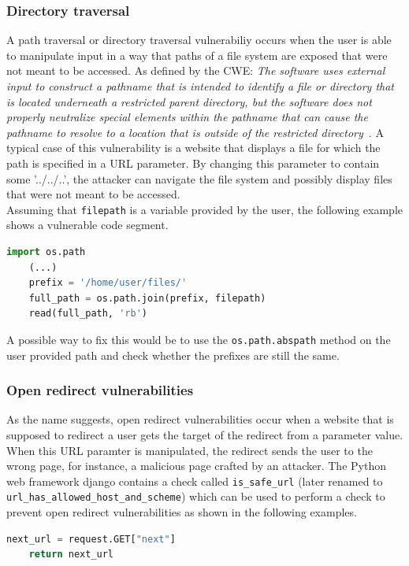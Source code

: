 \documentclass[
a4paper,
pagesize,
pdftex,
12pt,
twoside, %
BCOR=5mm, %
ngerman,
fleqn,
final,
]{scrartcl}
\begin{document}
	\subsubsection{Directory traversal}
	A path traversal or directory traversal vulnerabiliy occurs when the user is able to manipulate input in a way that paths of a file system are exposed that were not meant to be accessed. 
	As defined by the CWE: \textit{The software uses external input to construct a pathname that is intended to identify a file or directory that is located underneath a restricted parent directory, but the software does not properly neutralize special elements within the pathname that can cause the pathname to resolve to a location that is outside of the restricted directory}~\cite{CommonWeaknessEnumeration.19.9.2019c}. A typical case of this vulnerability is a website that displays a file for which the path is specified in a URL parameter. By changing this parameter to contain some '../../..', the attacker can navigate the file system and possibly display files that were not meant to be accessed.\\
	Assuming that \texttt{filepath} is a variable provided by the user, the following example shows a vulnerable code segment.
	\begin{lstlisting}[language=Python, showstringspaces=False]
	import os.path
	(...)
	prefix = '/home/user/files/'
	full_path = os.path.join(prefix, filepath)
	read(full_path, 'rb')
	\end{lstlisting}
	A possible way to fix this would be to use the \texttt{os.path.abspath} method on the user provided path and check whether the prefixes are still the same. 
	
	
	
	\subsubsection{Open redirect vulnerabilities}
	As the name suggests, open redirect vulnerabilities occur when a website that is supposed to redirect a user gets the target of the redirect from a parameter value. When this URL paramter is manipulated, the redirect sends the user to the wrong page, for instance, a malicious page crafted by an attacker. The Python web framework django contains a check called \texttt{is\_safe\_url} (later renamed to \texttt{url\_has\_allowed\_host\_and\_scheme}) which can be used to perform a check to prevent open redirect vulnerabilities as shown in the following examples.
	
	\begin{lstlisting}[language=Python, showstringspaces=False]
	next_url = request.GET["next"]
	return next_url
	\end{lstlisting}
	
\end{document}
